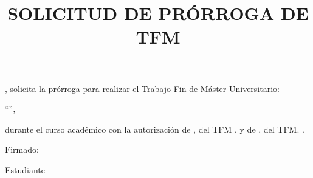 \documentclass[11pt,a4paper,oneside]{article}
\title{SOLICITUD DE PRÓRROGA DE TFM}
\date{}
\begin{document}
{\Large
\maketitle

\thispagestyle{empty}

\wordDonOrDonaAutor{} \myAuthorFullName{}, solicita la prórroga para realizar el
Trabajo Fin de Máster Universitario:

\vspace{0.5cm}

``\myBookTitle'',

\vspace{0.5cm}

\noindent durante el curso académico \myThesisAcademicYear{} con la autorización de
\wordDonOrDonaTutor{} \myAcademicTutorFullName{}, \wordDirectorOrdirectora{} del TFM%
\ifCoTutorPresent%
  {, y de \wordDonOrDonaCoTutor{} \myCoTutorFullName{},
   \wordCoDirectorOrCoDirectora{} del TFM.}%
  {.}

\vspace{2cm}

Firmado:

\vspace{4cm}

\begin{minipage}[t]{0.58\textwidth}
\centering
\wordDirectorOrDirectoraTitle{}%
\end{minipage}%
\begin{minipage}[t]{0.42\textwidth}
\centering
Estudiante
\end{minipage}

}
\end{document}
